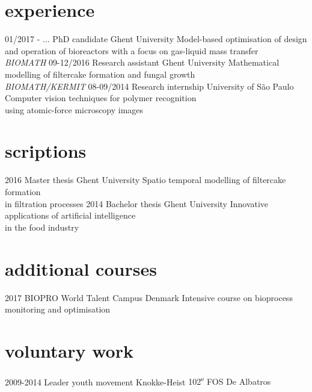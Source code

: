 \documentclass[]{friggeri-cv}
\begin{document}
\section{experience}
\begin{entrylist}
  \entry
    {01/2017 - ...}
    {PhD candidate}
    {Ghent University}
    {Model-based optimisation of design and operation of bioreactors with a focus on gas-liquid mass transfer \\ \textit{BIOMATH}}
    \entry
    {09-12/2016}
    {Research assistant}
    {Ghent University}
    {Mathematical modelling of filtercake formation and fungal growth \\{\textit{BIOMATH/KERMIT}}}
    \entry
    {08-09/2014}
    {Research internship}
    {University of S\~{a}o Paulo}
    {Computer vision techniques for polymer recognition\\ using atomic-force microscopy images}
\end{entrylist}

\section{scriptions}
\begin{entrylist}
  \entry
    {2016}
    {Master thesis}
    {Ghent University}
    {Spatio temporal modelling of filtercake formation\\ in filtration processes}
  \entry
    {2014}
    {Bachelor thesis}
    {Ghent University}
    {Innovative applications of artificial intelligence\\ in the food industry}
\end{entrylist}

\section{additional courses}
\begin{entrylist}
  \entry
    {2017}
    {BIOPRO World Talent Campus}
    {Denmark}
    {Intensive course on bioprocess monitoring and optimisation}
\end{entrylist}

\section{voluntary work}
\begin{entrylist}
 \entry
    {2009-2014}
    {Leader youth movement}
    {Knokke-Heist}
    {102\textsuperscript{e} FOS De Albatros}
\end{entrylist} 
   
\end{document}

